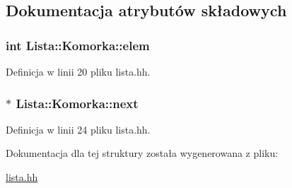 \subsection{Dokumentacja atrybutów składowych}
\hypertarget{struct_lista_1_1_komorka_aeb683e1dce8a8c096cc54a6645137411}{
\subsubsection[{elem}]{\setlength{\rightskip}{0pt plus 5cm}int Lista\-::\-Komorka\-::elem}}\label{struct_lista_1_1_komorka_aeb683e1dce8a8c096cc54a6645137411}


Definicja w linii 20 pliku lista.\-hh.

\hypertarget{struct_lista_1_1_komorka_aa04e9d2ed0260f2adbff6855f7bcd77e}{
\subsubsection[{next}]{$\ast$ Lista\-::\-Komorka\-::next}}\label{struct_lista_1_1_komorka_aa04e9d2ed0260f2adbff6855f7bcd77e}


Definicja w linii 24 pliku lista.\-hh.



Dokumentacja dla tej struktury została wygenerowana z pliku\-:\begin{DoxyCompactItemize}
\item 
\hyperlink{lista_8hh}{lista.\-hh}\end{DoxyCompactItemize}
